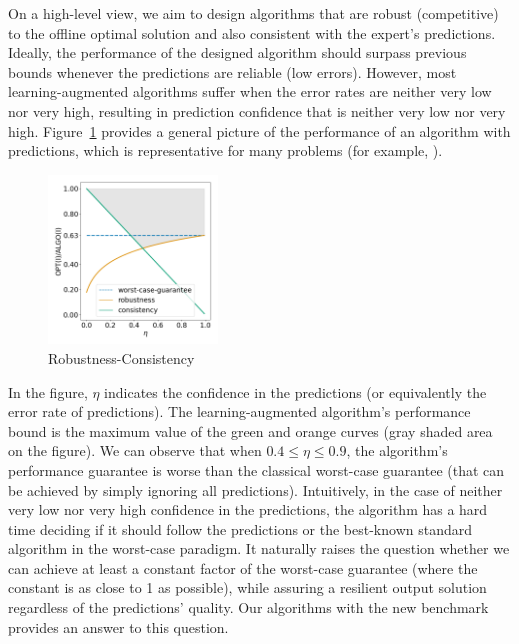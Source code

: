 On a high-level view, we aim to design algorithms that are robust (competitive) to the offline optimal solution and also consistent with the expert's predictions. Ideally, the performance of the designed algorithm should surpass previous bounds whenever the predictions are reliable (low errors).
However, most learning-augmented algorithms suffer when the error rates are neither very low nor very high, resulting in prediction confidence that is neither very low nor very high.
Figure~\ref{fig:robustness-consistency} provides a general picture of the performance of an algorithm with predictions, which is representative for many problems (for example, \cite{BamasMaggoriSvensson20:primal-dual-method,KeviNguyen23:Primal-Dual-Algorithms}).

\begin{figure}[!ht]
    \centering
    \includegraphics[width=0.4\textwidth]{../paper/Img/consistency_robustness.png}
    \caption{Robustness-Consistency}
    \label{fig:robustness-consistency}
\end{figure}

\noindent In the figure, $\eta$ indicates the confidence in the predictions (or equivalently the error rate of predictions). The learning-augmented algorithm's performance bound is the maximum value of the green and orange curves (gray shaded area on the figure). We can observe that when $0.4 \leq \eta \leq 0.9$,
the algorithm's performance guarantee is worse than the classical worst-case guarantee (that can be achieved by simply ignoring all predictions).
Intuitively, in the case of neither very low nor very high confidence in the predictions, the algorithm has a hard time deciding if it should follow the predictions or the best-known standard algorithm in the worst-case paradigm.
It naturally raises the question whether we can achieve at least a constant factor of the worst-case guarantee (where the constant is as close to 1 as possible), while assuring a resilient output solution regardless of the predictions' quality.
Our algorithms with the new benchmark provides an answer to this question.



